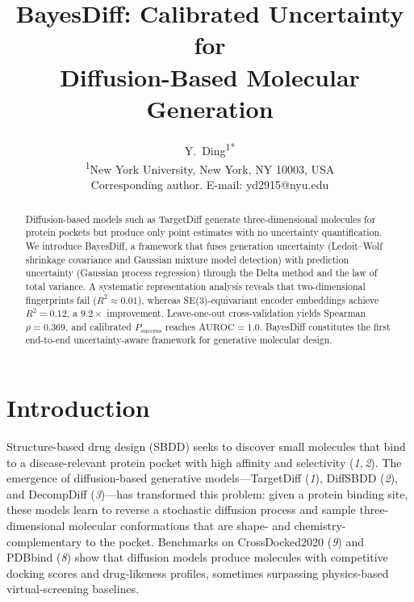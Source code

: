 \documentclass{article}
\title{BayesDiff: Calibrated Uncertainty for\\Diffusion-Based Molecular Generation}
\author{
  Y.~Ding\textsuperscript{1*}\\[6pt]
  \textsuperscript{1}New York University, New York, NY 10003, USA\\[4pt]
  \small *Corresponding author. E-mail: yd2915@nyu.edu
}
\date{}
\newcommand{\Psuccess}{P_{\mathrm{success}}}
\newcommand{\scite}[1]{(\textit{#1})}
\begin{document}
\maketitle

\begin{abstract}
\noindent
Diffusion-based models such as TargetDiff generate three-dimensional
molecules for protein pockets but produce only point estimates with no
uncertainty quantification.  We introduce BayesDiff, a framework that
fuses generation uncertainty (Ledoit--Wolf shrinkage covariance and
Gaussian mixture model detection) with prediction uncertainty (Gaussian
process regression) through the Delta method and the law of total
variance.  A systematic representation analysis reveals that
two-dimensional fingerprints fail ($R^{2}\!\approx\!0.01$), whereas
SE(3)-equivariant encoder embeddings achieve $R^{2}\!=\!0.12$, a
$9.2\times$ improvement.  Leave-one-out cross-validation yields Spearman
$\rho\!=\!0.369$, and calibrated $\Psuccess$ reaches
$\mathrm{AUROC}\!=\!1.0$.  BayesDiff constitutes the first end-to-end
uncertainty-aware framework for generative molecular design.
\end{abstract}


\section{Introduction}

Structure-based drug design (SBDD) seeks to discover small molecules
that bind to a disease-relevant protein pocket with high affinity and
selectivity \scite{1,\,2}.  The emergence of diffusion-based generative
models---TargetDiff \scite{1}, DiffSBDD \scite{2}, and DecompDiff
\scite{3}---has transformed this problem: given a protein binding site,
these models learn to reverse a stochastic diffusion process and sample
three-dimensional molecular conformations that are shape- and
chemistry-complementary to the pocket.  Benchmarks on CrossDocked2020
\scite{9} and PDBbind \scite{8} show that diffusion models produce
molecules with competitive docking scores and drug-likeness profiles,
sometimes surpassing physics-based virtual-screening baselines.
\end{document}
